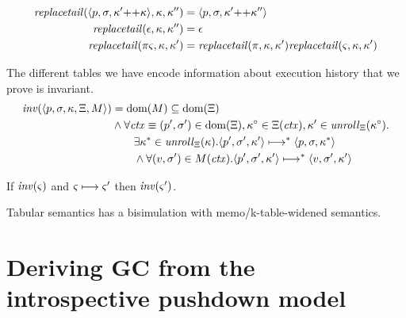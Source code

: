 \begin{align*}
  \mathit{replacetail}(\langle p,\sigma,\kappa' {\tt ++} \kappa \rangle,\kappa,\kappa'') &= \langle p,\sigma,\kappa' {\tt ++} \kappa'' \rangle \\
  \mathit{replacetail}(\epsilon,\kappa,\kappa'') &= \epsilon \\
  \mathit{replacetail}(\pi\varsigma,\kappa,\kappa') &= \mathit{replacetail}(\pi,\kappa,\kappa')\mathit{replacetail}(\varsigma,\kappa,\kappa') \\
\end{align*}

The different tables we have encode information about execution history that we prove is invariant.
\begin{align*}
  \mathit{inv}(\langle p, \sigma, \kappa, \Xi, M \rangle) &=
          \text{dom}(M) \subseteq \text{dom}(\Xi) \\
  &\wedge \forall \mathit{ctx}\equiv(p',\sigma') \in \text{dom}(\Xi),
                  \kappa^\circ \in \Xi(\mathit{ctx}),
                  \kappa' \in \mathit{unroll}_{\Xi}(\kappa^\circ). \\
  &\qquad \exists \kappa^* \in \mathit{unroll}_{\Xi}(\kappa).
            \langle p', \sigma', \kappa' \rangle \longmapsto^* \langle p, \sigma, \kappa^* \rangle \\
  &\qquad \wedge \forall (v, \sigma') \in M(\mathit{ctx}).
            \langle p', \sigma', \kappa' \rangle \longmapsto^* \langle v,\sigma', \kappa' \rangle
\end{align*}

\begin{lemma}\label{lem:tab-inv}
  If $\mathit{inv}(\varsigma)$ and $\varsigma \longmapsto \varsigma'$ then $\mathit{inv}(\varsigma')$.
\end{lemma}

\begin{theorem}\label{thm:global}
  Tabular semantics has a bisimulation with memo/k-table-widened semantics.
\end{theorem}

\section{Deriving GC from the introspective pushdown model}


